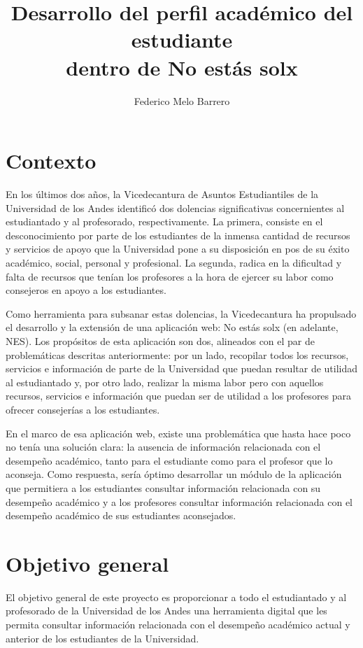 \documentclass{fmbproyectogrado}
\title{Desarrollo del perfil académico del estudiante\\dentro de No estás solx}
\author{Federico Melo Barrero\inst{1}}
\begin{document}
\maketitle

\section{Contexto}

En los últimos dos años, la Vicedecantura de Asuntos Estudiantiles de la Universidad de los Andes identificó dos dolencias significativas concernientes al estudiantado y al profesorado, respectivamente. La primera, consiste en el desconocimiento por parte de los estudiantes de la inmensa cantidad de recursos y servicios de apoyo que la Universidad pone a su disposición en pos de su éxito académico, social, personal y profesional. La segunda, radica en la dificultad y falta de recursos que tenían los profesores a la hora de ejercer su labor como consejeros en apoyo a los estudiantes.

Como herramienta para subsanar estas dolencias, la Vicedecantura ha propulsado el desarrollo y la extensión de una aplicación web: No estás solx (en adelante, NES). Los propósitos de esta aplicación son dos, alineados con el par de problemáticas descritas anteriormente: por un lado, recopilar todos los recursos, servicios e información de parte de la Universidad que puedan resultar de utilidad al estudiantado y, por otro lado, realizar la misma labor pero con aquellos recursos, servicios e información que puedan ser de utilidad a los profesores para ofrecer consejerías a los estudiantes.

En el marco de esa aplicación web, existe una problemática que hasta hace poco no tenía una solución clara: la ausencia de información relacionada con el desempeño académico, tanto para el estudiante como para el profesor que lo aconseja. Como respuesta, sería óptimo desarrollar un módulo de la aplicación que permitiera a los estudiantes consultar información relacionada con su desempeño académico y a los profesores consultar información relacionada con el desempeño académico de sus estudiantes aconsejados.


\section{Objetivo general}

El objetivo general de este proyecto es proporcionar a todo el estudiantado y al profesorado de la Universidad de los Andes una herramienta digital que les permita consultar información relacionada con el desempeño académico actual y anterior de los estudiantes de la Universidad.
\end{document}

